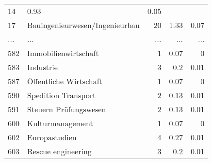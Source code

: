 \begin{longtable}{lXrrr}
          \num{14} &
          \num[round-mode=places,round-precision=2]{0.93} &
          \num[round-mode=places,round-precision=2]{0.05} \\
        17 & \multicolumn{1}{X}{Bauingenieurwesen/Ingenieurbau} & %
          \num{20} &
          \num[round-mode=places,round-precision=2]{1.33} &
          \num[round-mode=places,round-precision=2]{0.07} \\
       ... & ... & ... & ... & ... \\
        582 & \multicolumn{1}{X}{Immobilienwirtschaft} & %
          \num{1} &
          \num[round-mode=places,round-precision=2]{0.07} &
          \num[round-mode=places,round-precision=2]{0} \\

        583 & \multicolumn{1}{X}{Industrie} & %
          \num{3} &
          \num[round-mode=places,round-precision=2]{0.2} &
          \num[round-mode=places,round-precision=2]{0.01} \\

        587 & \multicolumn{1}{X}{Öffentliche Wirtschaft} & %
          \num{1} &
          \num[round-mode=places,round-precision=2]{0.07} &
          \num[round-mode=places,round-precision=2]{0} \\

        590 & \multicolumn{1}{X}{Spedition Transport} & %
          \num{2} &
          \num[round-mode=places,round-precision=2]{0.13} &
          \num[round-mode=places,round-precision=2]{0.01} \\

        591 & \multicolumn{1}{X}{Steuern Prüfungswesen} & %
          \num{2} &
          \num[round-mode=places,round-precision=2]{0.13} &
          \num[round-mode=places,round-precision=2]{0.01} \\

        600 & \multicolumn{1}{X}{Kulturmanagement} & %
          \num{1} &
          \num[round-mode=places,round-precision=2]{0.07} &
          \num[round-mode=places,round-precision=2]{0} \\

        602 & \multicolumn{1}{X}{Europastudien} & %
          \num{4} &
          \num[round-mode=places,round-precision=2]{0.27} &
          \num[round-mode=places,round-precision=2]{0.01} \\

        603 & \multicolumn{1}{X}{Rescue engineering} & %
          \num{3} &
          \num[round-mode=places,round-precision=2]{0.2} &
          \num[round-mode=places,round-precision=2]{0.01} \\


\end{longtable}
